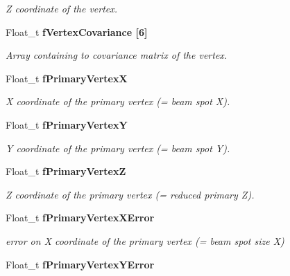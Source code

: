 \begin{CompactItemize}
\begin{CompactList}\small\item\em Z coordinate of the vertex. \item\end{CompactList}\item 
Float\_\-t \bf{f\-Vertex\-Covariance} [6]\label{classTVertex_c6a478e22ba5b538b2df318a6a713245}

\begin{CompactList}\small\item\em Array containing to covariance matrix of the vertex. \item\end{CompactList}\item 
Float\_\-t \bf{f\-Primary\-Vertex\-X}\label{classTVertex_22131d10d49d69d72d80c62f5d47bc21}

\begin{CompactList}\small\item\em X coordinate of the primary vertex (= beam spot X). \item\end{CompactList}\item 
Float\_\-t \bf{f\-Primary\-Vertex\-Y}\label{classTVertex_43ae65e3e888dbc1bcf000875ca6dd72}

\begin{CompactList}\small\item\em Y coordinate of the primary vertex (= beam spot Y). \item\end{CompactList}\item 
Float\_\-t \bf{f\-Primary\-Vertex\-Z}\label{classTVertex_9542a039c83ef6001b229e6f510fad5f}

\begin{CompactList}\small\item\em Z coordinate of the primary vertex (= reduced primary Z). \item\end{CompactList}\item 
Float\_\-t \bf{f\-Primary\-Vertex\-XError}\label{classTVertex_b7bc0a355feacfb0b02c119dbc951d76}

\begin{CompactList}\small\item\em error on X coordinate of the primary vertex (= beam spot size X) \item\end{CompactList}\item 
Float\_\-t \bf{f\-Primary\-Vertex\-YError}\label{classTVertex_397f063bfe74e1be06e5ff0ae411a55f}


\end{CompactItemize}
